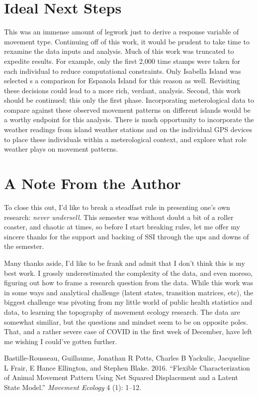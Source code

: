 \documentclass{article}
\newlength{\cslhangindent}
\newlength{\cslentryspacingunit} %
\newenvironment{CSLReferences}[2] %
 {%
  \setlength{\parindent}{0pt}
  \ifodd #1
  \let\oldpar\par
  \def\par{\hangindent=\cslhangindent\oldpar}
  \fi
  \setlength{\parskip}{#2\cslentryspacingunit}
 }%
 {}
\begin{document}
\hypertarget{ideal-next-steps}{%
\section{Ideal Next Steps}\label{ideal-next-steps}}

This was an immense amount of legwork just to derive a response variable
of movement type. Continuing off of this work, it would be prudent to
take time to rexamine the data inputs and analysis. Much of this work
was truncated to expedite results. For example, only the first 2,000
time stamps were taken for each individual to reduce computational
constraints. Only Isabella Island was selected s a comparison for
Espanola Island for this reason as well. Revisiting these decisions
could lead to a more rich, verdant, analysis. Second, this work should
be continued; this only the first phase. Incorporating meterological
data to compare against these observed movement patterns on different
islands would be a worthy endpoint for this analysis. There is much
opportunity to incorporate the weather readings from island weather
stations and on the individual GPS devices to place these individuals
within a meterological context, and explore what role weather plays on
movement patterns.

\hypertarget{a-note-from-the-author}{%
\section{A Note From the Author}\label{a-note-from-the-author}}

To close this out, I'd like to break a steadfast rule in presenting
one's own research: \emph{never undersell}. This semester was without
doubt a bit of a roller coaster, and chaotic at times, so before I start
breaking rules, let me offer my sincere thanks for the support and
backing of SSI through the ups and downs of the semester.

Many thanks aside, I'd like to be frank and admit that I don't think
this is my best work. I grossly underestimated the complexity of the
data, and even moreso, figuring out how to frame a research question
from the data. While this work was in some ways and analytical challenge
(latent states, transition matrices, etc), the biggest challenge was
pivoting from my little world of public health statistics and data, to
learning the topography of movement ecology research. The data are
somewhat similiar, but the questions and mindset seem to be on opposite
poles. That, and a rather severe case of COVID in the first week of
December, have left me wishing I could've gotten further.

\hypertarget{refs}{}
\begin{CSLReferences}{1}{0}
\leavevmode{}%
Bastille-Rousseau, Guillaume, Jonathan R Potts, Charles B Yackulic,
Jacqueline L Frair, E Hance Ellington, and Stephen Blake. 2016.
{``Flexible Characterization of Animal Movement Pattern Using Net
Squared Displacement and a Latent State Model.''} \emph{Movement
Ecology} 4 (1): 1--12.

\end{CSLReferences}



\end{document}
